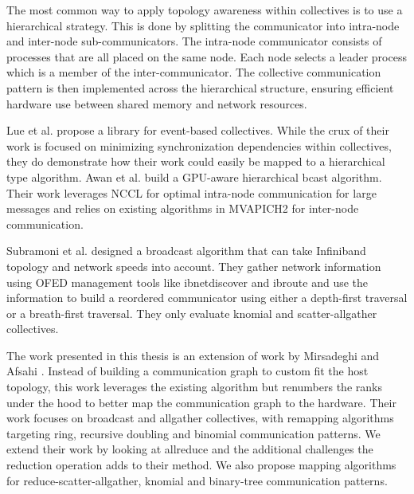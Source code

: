 The most common way to apply topology awareness within collectives is to use a hierarchical strategy.
This is done by splitting the communicator into intra-node and inter-node sub-communicators.
The intra-node communicator consists of processes that are all placed on the same node.
Each node selects a leader process which is a member of the inter-communicator.
The collective communication pattern is then implemented across the hierarchical structure, ensuring efficient hardware use between shared memory and network resources.

Lue et al. \cite{Luo2018ADAPT} propose a library for event-based collectives.
While the crux of their work is focused on minimizing synchronization dependencies within collectives, they do demonstrate how their work could easily be mapped to a hierarchical type algorithm.
Awan et al. \cite{Awan2016NCCLBcast} build a GPU-aware hierarchical bcast algorithm.
Their work leverages NCCL for optimal intra-node communication for large messages and relies on existing algorithms in MVAPICH2 for inter-node communication.

Subramoni et al. \cite{Subramoni2011SpeedAwareBcast} designed a broadcast algorithm that can take Infiniband topology and network speeds into account.
They gather network information using OFED management tools like ibnetdiscover and ibroute and use the information to build a reordered communicator using either a depth-first traversal or a breath-first traversal.
They only evaluate knomial and scatter-allgather collectives.

The work presented in this thesis is an extension of work by Mirsadeghi and Afsahi \cite{Mirsadeghi2016TopoAwareCollRR}.
Instead of building a communication graph to custom fit the host topology, this work leverages the existing algorithm but renumbers the ranks under the hood to better map the communication graph to the hardware.
Their work focuses on broadcast and allgather collectives, with remapping algorithms targeting ring, recursive doubling and binomial communication patterns.
We extend their work by looking at allreduce and the additional challenges the reduction operation adds to their method.
We also propose mapping algorithms for reduce-scatter-allgather, knomial and binary-tree communication patterns.

